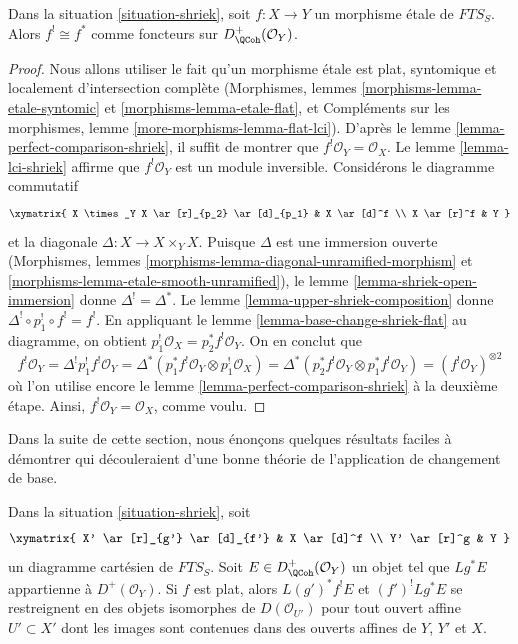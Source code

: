 \begin{lemma}
\label{lemma-shriek-etale}
Dans la situation \ref{situation-shriek}, soit $f : X \to Y$ un morphisme \'etale de $\textit{FTS}_S$. Alors $f^! \cong f^*$ comme foncteurs sur $D^+_\QCoh(\mathcal{O}_Y)$.
\end{lemma}

\begin{proof}
Nous allons utiliser le fait qu'un morphisme \'etale est plat, syntomique et localement d'intersection complète (Morphismes, lemmes \ref{morphisms-lemma-etale-syntomic} et \ref{morphisms-lemma-etale-flat}, et Compléments sur les morphismes, lemme \ref{more-morphisms-lemma-flat-lci}). D'après le lemme \ref{lemma-perfect-comparison-shriek}, il suffit de montrer que $f^!\mathcal{O}_Y = \mathcal{O}_X$. Le lemme \ref{lemma-lci-shriek} affirme que $f^!\mathcal{O}_Y$ est un module inversible. Considérons le diagramme commutatif
$$
\xymatrix{
X \times_Y X \ar[r]_{p_2} \ar[d]_{p_1} & X \ar[d]^f \\
X \ar[r]^f & Y
}
$$
et la diagonale $\Delta : X \to X \times_Y X$. Puisque $\Delta$ est une immersion ouverte (Morphismes, lemmes \ref{morphisms-lemma-diagonal-unramified-morphism} et \ref{morphisms-lemma-etale-smooth-unramified}), le lemme \ref{lemma-shriek-open-immersion} donne $\Delta^! = \Delta^*$. Le lemme \ref{lemma-upper-shriek-composition} donne $\Delta^! \circ p_1^! \circ f^! = f^!$. En appliquant le lemme \ref{lemma-base-change-shriek-flat} au diagramme, on obtient $p_1^!\mathcal{O}_X = p_2^*f^!\mathcal{O}_Y$. On en conclut que
$$
f^!\mathcal{O}_Y = \Delta^!p_1^!f^!\mathcal{O}_Y =
\Delta^*(p_1^*f^!\mathcal{O}_Y \otimes p_1^!\mathcal{O}_X) =
\Delta^*(p_2^*f^!\mathcal{O}_Y \otimes p_1^*f^!\mathcal{O}_Y) =
(f^!\mathcal{O}_Y)^{\otimes 2}
$$
où l'on utilise encore le lemme \ref{lemma-perfect-comparison-shriek} à la deuxième étape. Ainsi, $f^!\mathcal{O}_Y = \mathcal{O}_X$, comme voulu.
\end{proof}


\noindent
Dans la suite de cette section, nous énonçons quelques résultats faciles à démontrer qui découleraient d'une bonne théorie de l'application de changement de base.

\begin{lemma}
\label{lemma-base-change-locally}
Dans la situation \ref{situation-shriek}, soit
$$
\xymatrix{
X' \ar[r]_{g'} \ar[d]_{f'} & X \ar[d]^f \\
Y' \ar[r]^g & Y
}
$$
un diagramme cartésien de $\textit{FTS}_S$. Soit $E \in D^+_\QCoh(\mathcal{O}_Y)$ un objet tel que $Lg^*E$ appartienne à $D^+(\mathcal{O}_Y)$. Si $f$ est plat, alors $L(g')^*f^!E$ et $(f')^!Lg^*E$ se restreignent en des objets isomorphes de $D(\mathcal{O}_{U'})$ pour tout ouvert affine $U' \subset X'$ dont les images sont contenues dans des ouverts affines de $Y$, $Y'$ et $X$.
\end{lemma}

